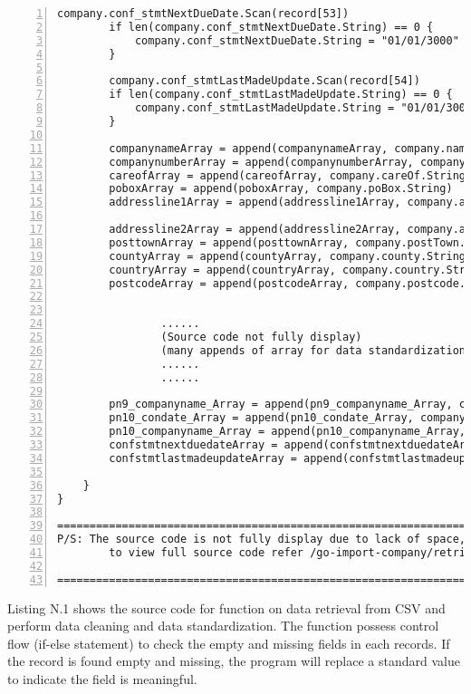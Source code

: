 \begin{lstlisting}[breaklines, frame=single, numbers=left, caption={Parse and cleaned data retrieved from CSV}, label=commandline-02]
		company.conf_stmtNextDueDate.Scan(record[53])
		if len(company.conf_stmtNextDueDate.String) == 0 {
			company.conf_stmtNextDueDate.String = "01/01/3000"
		}
		
		company.conf_stmtLastMadeUpdate.Scan(record[54])
		if len(company.conf_stmtLastMadeUpdate.String) == 0 {
			company.conf_stmtLastMadeUpdate.String = "01/01/3000"
		}
		
		companynameArray = append(companynameArray, company.name.String)
		companynumberArray = append(companynumberArray, company.number)
		careofArray = append(careofArray, company.careOf.String)
		poboxArray = append(poboxArray, company.poBox.String)
		addressline1Array = append(addressline1Array, company.addressLine1.String)
		
		addressline2Array = append(addressline2Array, company.addressLine2.String) 
		posttownArray = append(posttownArray, company.postTown.String) 
		countyArray = append(countyArray, company.county.String) 
		countryArray = append(countryArray, company.country.String) 
		postcodeArray = append(postcodeArray, company.postcode.String) 
	
		
				...... 
				(Source code not fully display)
				(many appends of array for data standardization ....)
				......
				......
				
		pn9_companyname_Array = append(pn9_companyname_Array, company.pn9_companyname.String)
		pn10_condate_Array = append(pn10_condate_Array, company.pn10_condate.String)
		pn10_companyname_Array = append(pn10_companyname_Array, company.pn10_companyname.String)
		confstmtnextduedateArray = append(confstmtnextduedateArray, company.conf_stmtNextDueDate.String)
		confstmtlastmadeupdateArray = append(confstmtlastmadeupdateArray, company.conf_stmtLastMadeUpdate.String)
	
	}
}

================================================================
P/S: The source code is not fully display due to lack of space, 
		to view full source code refer /go-import-company/retrieve-csv.go
		
================================================================

\end{lstlisting}

Listing N.1 shows the source code for function on data retrieval from CSV and perform data cleaning and data standardization. The function possess control flow (if-else statement) to check the empty and missing fields in each records. If the record is found empty and missing, the program will replace a standard value to indicate the field is meaningful. 

